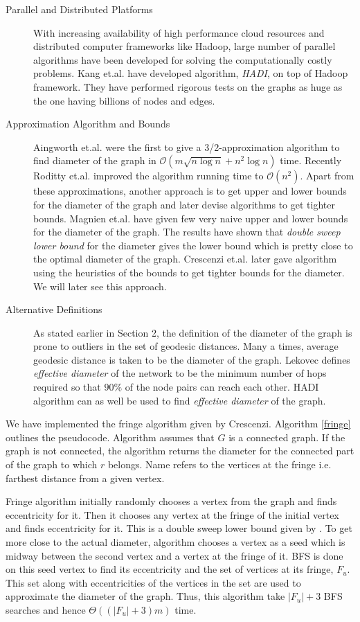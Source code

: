 \documentclass[12pt]{article}
\begin{document}
\begin{description}
	\item[Parallel and Distributed Platforms]
	With increasing availability of high performance cloud resources and distributed computer frameworks like Hadoop, large number of parallel algorithms have been developed for solving the computationally costly problems. Kang et.al.\cite{HADI} have developed algorithm, {\it HADI}, on top of Hadoop framework. They have performed rigorous tests on the graphs as huge as the one having billions of nodes and edges.
	\item[Approximation Algorithm and Bounds]
	Aingworth et.al.\cite{aingworth} were the first to give a 3/2-approximation algorithm to find diameter of the graph in $\mathcal{O}(m\sqrt{n\log n} + n^2 \log n)$ time. Recently Roditty et.al.\cite{roditty} improved the algorithm running time to $\mathcal{O}(n^2)$. Apart from these approximations, another approach is to get upper and lower bounds for the diameter of the graph and later devise algorithms to get tighter bounds. Magnien et.al.\cite{magnien} have given few very naive upper and lower bounds for the diameter of the graph. The results have shown that {\it double sweep lower bound} for the diameter gives the lower bound which is pretty close to the optimal diameter of the graph. Crescenzi et.al.\cite{crescenzi} later gave algorithm using the heuristics of the bounds to get tighter bounds for the diameter. We will later see this approach.
	\item[Alternative Definitions]
	As stated earlier in Section 2, the definition of the diameter of the graph is prone to outliers in the set of geodesic distances. Many a times, average geodesic distance is taken to be the diameter of the graph. Lekovec\cite{leskovec} defines {\it effective diameter} of the network to be the minimum number of hops required so that $90\%$ of the node pairs can reach each other. HADI algorithm can as well be used to find {\it effective diameter} of the graph.
\end{description}
We have implemented the fringe algorithm given by Crescenzi. Algorithm \ref{fringe} outlines the pseudocode. Algorithm assumes that $G$ is a connected graph. If the graph is not connected, the algorithm returns the diameter for the connected part of the graph to which $r$ belongs. Name refers to the vertices at the fringe i.e. farthest distance from a given vertex.
\par Fringe algorithm initially randomly chooses a vertex from the graph and finds eccentricity for it. Then it chooses any vertex at the fringe of the initial vertex and finds eccentricity for it. This is a double sweep lower bound given by \cite{magnien}. To get more close to the actual diameter, algorithm chooses a vertex as a seed which is midway between the second vertex and a vertex at the fringe of it. BFS is done on this seed vertex to find its eccentricity and the set of vertices at its fringe, $F_u$. This set along with eccentricities of the vertices in the set are used to approximate the diameter of the graph. Thus, this algorithm take $|F_u| + 3$ BFS searches and hence $\Theta((|F_u| + 3)m)$ time.
\end{document}
